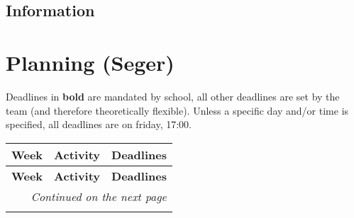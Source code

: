 \documentclass{article}
\begin{document}
\subsection{Information}


\newpage

\section{Planning (Seger)}
Deadlines in \textbf{bold} are mandated by school, all other deadlines are set by the team (and therefore theoretically flexible).
Unless a specific day and/or time is specified, all deadlines are on friday, 17:00.
\begin{longtable}{|l|p{}|p{}|}
    \hline
    \textbf{Week} & \textbf{Activity}                         & \textbf{Deadlines}                      \\ \hline
    \endfirsthead

    \hline
    \textbf{Week} & \textbf{Activity}                         & \textbf{Deadlines}                      \\ \hline
    \endhead

    \hline \multicolumn{3}{r}{\textit{Continued on the next page}}                                             \\ \hline
    \endfoot

    \hline
    \endlastfoot


\end{longtable}
\end{document}
